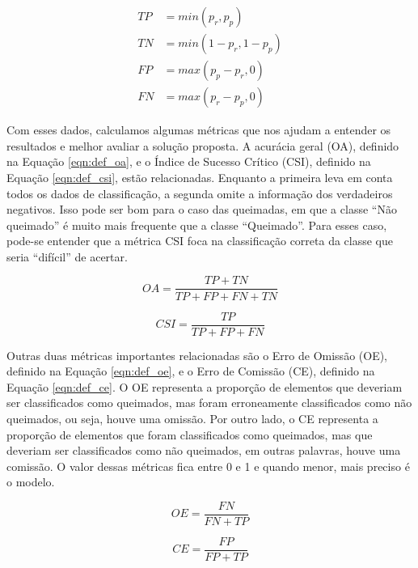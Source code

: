 \documentclass[cic,tc]{iiufrgs}
\begin{document}
\begin{equation} \label{eqn:def_values}
\begin{split}
	TP & = min\left(p_r, p_p\right) \\
	TN & = min\left(1 - p_r, 1 - p_p\right) \\
	FP & = max\left(p_p - p_r, 0\right) \\
	FN & = max\left(p_r - p_p, 0\right)
\end{split}
\end{equation}

Com esses dados, calculamos algumas métricas que nos ajudam a entender os resultados e melhor avaliar a solução proposta. A acurácia geral (OA), definido na Equação \ref{eqn:def_oa}, e o Índice de Sucesso Crítico (CSI), definido na Equação \ref{eqn:def_csi}, estão relacionadas. Enquanto a primeira leva em conta todos os dados de classificação, a segunda omite a informação dos verdadeiros negativos. Isso pode ser bom para o caso das queimadas, em que a classe ``Não queimado'' é muito mais frequente que a classe ``Queimado''. Para esses caso, pode-se entender que a métrica CSI foca na classificação correta da classe que seria ``difícil'' de acertar.

\begin{equation} \label{eqn:def_oa}
  OA = \frac{TP + TN}{TP + FP + FN + TN}
\end{equation}

\begin{equation} \label{eqn:def_csi}
  CSI = \frac{TP}{TP + FP + FN}
\end{equation}

Outras duas métricas importantes relacionadas são o Erro de Omissão (OE), definido na Equação \ref{eqn:def_oe}, e o Erro de Comissão (CE), definido na Equação \ref{eqn:def_ce}. O OE representa a proporção de elementos que deveriam ser classificados como queimados, mas foram erroneamente classificados como não queimados, ou seja, houve uma omissão. Por outro lado, o CE representa a proporção de elementos que foram classificados como queimados, mas que deveriam ser classificados como não queimados, em outras palavras, houve uma comissão. O valor dessas métricas fica entre 0 e 1 e quando menor, mais preciso é o modelo.

\begin{equation} \label{eqn:def_oe}
  OE = \frac{FN}{FN + TP}
\end{equation}

\begin{equation} \label{eqn:def_ce}
  CE = \frac{FP}{FP + TP}
\end{equation}
\end{document}
